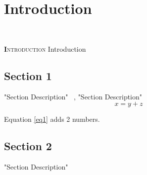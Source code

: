 


\chapter{Introduction}
\HRule \\[2cm] %

\label{Chapter1} %


\begin{spacing}{1.6}

\lettrine[lines=1]{\textbf{I}}{ntroduction} Introduction

\section{Section 1}
"Section Description" ~\cite{Cite01}, "Section Description"
\begin{equation}
\label{eq1}
x = y + z
\end{equation}

Equation \ref{eq1} adds 2 numbers.


\section{Section 2}
"Section Description"



\end{spacing} 